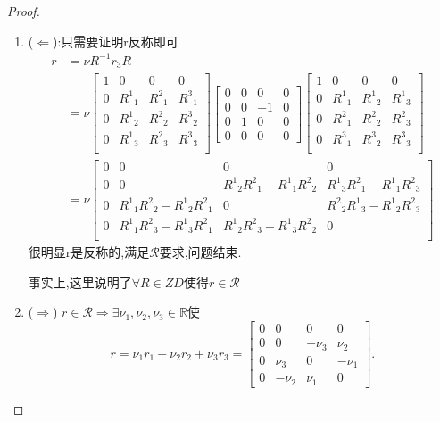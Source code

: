 \documentclass[../main.tex]{subfiles}
\begin{document}
\begin{proof}
  \begin{enumerate}
    \item ($\Leftarrow$):只需要证明r反称即可
      \begin{align*}
        r &= \nu R^{-1}r_3R \\&= \nu   \begin{bmatrix} 
          1&0&0&0\\
          0&R^1{}_1 & R^2{}_1 & R^3{}_1 \\
          0&R^1{}_2 & R^2{}_2 & R^3{}_2 \\
        0&R^1{}_3 & R^2{}_3 & R^3{}_3 \\ \end{bmatrix} 
\begin{bmatrix} 0 & 0 & 0 & 0\\ 0& 0 & -1 & 0 \\ 0& 1 & 0& 0 \\0&0&0&0 \end{bmatrix} 
        \begin{bmatrix} 
          1&0&0&0\\
          0&R^1{}_1 & R^1{}_2 & R^1{}_3 \\
          0&R^2{}_1 & R^2{}_2 & R^2{}_3 \\
        0&R^3{}_1 & R^3{}_2 & R^3{}_3 \\ \end{bmatrix} \\
           &=\nu 
           \begin{bmatrix} 
             0&0&0&0\\
             0&0&R^{1}{}_{2}R^{2}{}_{1} - R^{1}{}_{1}R^{2}{}_{2}& R^{1}{}_{3}R^{2}{}_{1} - R^{1}{}_{1}R^{2}{}_{3}\\
             0&R^{1}{}_{1}R^{2}{}_{2} - R^{1}{}_{2}R^{2}{}_{1}& 0 & R^{2}{}_{2}R^{1}{}_{3} - R^{1}{}_{2}R^{2}{}_{3}\\
             0&R^{1}{}_{1}R^{2}{}_{3} - R^{1}{}_{3}R^{2}{}_{1}&R^{1}{}_{2}R^{2}{}_{3} - R^{1}{}_{3}R^{2}{}_{2}&0\\
           \end{bmatrix} 
\end{align*}
很明显r是反称的,满足$\mathscr{R}$要求,问题结束.
  \begin{note}
    事实上,这里说明了$\forall R \in ZD$使得$r\in \mathscr{R}$
  \end{note}
\item ($\Rightarrow$) $r \in \mathscr{R} \Rightarrow \exists \nu_1, \nu_2,\nu_3 \in \mathbb{R} $使\[
 r = \nu_1 r_1 + \nu_2 r_2 +\nu_3 r_3 = \begin{bmatrix} 
   0 & 0 & 0 & 0\\
   0 & 0 & -\nu_3 & \nu_2\\
   0&\nu_3 &0 & -\nu_1\\
   0 & -\nu_2&\nu_1&0
 \end{bmatrix} 
.\] 
  \end{enumerate} 


\end{proof}
\end{document}
